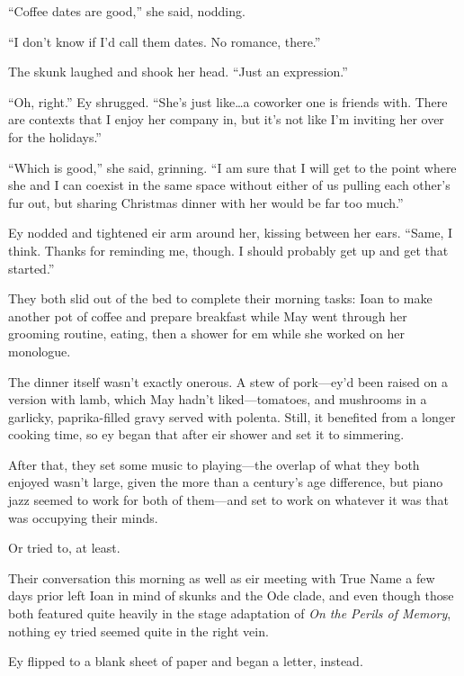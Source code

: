 ``Coffee dates are good,'' she said, nodding.

``I don't know if I'd call them dates. No romance, there.''

The skunk laughed and shook her head. ``Just an expression.''

``Oh, right.'' Ey shrugged. ``She's just like\ldots a coworker one is friends with. There are contexts that I enjoy her company in, but it's not like I'm inviting her over for the holidays.''

``Which is good,'' she said, grinning. ``I am sure that I will get to the point where she and I can coexist in the same space without either of us pulling each other's fur out, but sharing Christmas dinner with her would be far too much.''

Ey nodded and tightened eir arm around her, kissing between her ears. ``Same, I think. Thanks for reminding me, though. I should probably get up and get that started.''

They both slid out of the bed to complete their morning tasks: Ioan to make another pot of coffee and prepare breakfast while May went through her grooming routine, eating, then a shower for em while she worked on her monologue.

The dinner itself wasn't exactly onerous. A stew of pork—ey'd been raised on a version with lamb, which May hadn't liked—tomatoes, and mushrooms in a garlicky, paprika-filled gravy served with polenta. Still, it benefited from a longer cooking time, so ey began that after eir shower and set it to \mbox{simmering}.

After that, they set some music to playing—the overlap of what they both enjoyed wasn't large, given the more than a century's age difference, but piano jazz seemed to work for both of them—and set to work on whatever it was that was occupying their minds.

Or tried to, at least.

Their conversation this morning as well as eir meeting with True Name a few days prior left Ioan in mind of skunks and the Ode clade, and even though those both featured quite heavily in the stage adaptation of \emph{On the Perils of Memory}, nothing ey tried seemed quite in the right vein.

Ey flipped to a blank sheet of paper and began a letter, instead.

